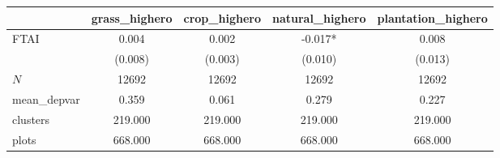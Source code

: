 {
\def\sym#1{\ifmmode^{#1}\else\(^{#1}\)\fi}
\begin{tabular}{l*{4}{c}}
\toprule
          &\multicolumn{1}{c}{grass\_highero}&\multicolumn{1}{c}{crop\_highero}&\multicolumn{1}{c}{natural\_highero}&\multicolumn{1}{c}{plantation\_highero}\\
\midrule
FTAI      &    0.004   &    0.002   &   -0.017*  &    0.008   \\
          &  (0.008)   &  (0.003)   &  (0.010)   &  (0.013)   \\
\midrule
\(N\)     &    12692   &    12692   &    12692   &    12692   \\
mean\_depvar&    0.359   &    0.061   &    0.279   &    0.227   \\
clusters  &  219.000   &  219.000   &  219.000   &  219.000   \\
plots     &  668.000   &  668.000   &  668.000   &  668.000   \\
\bottomrule
\end{tabular}
}
